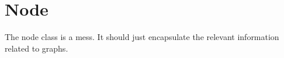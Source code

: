 \section{Node}
The node class is a mess. It should just encapsulate the relevant
information related to graphs.
